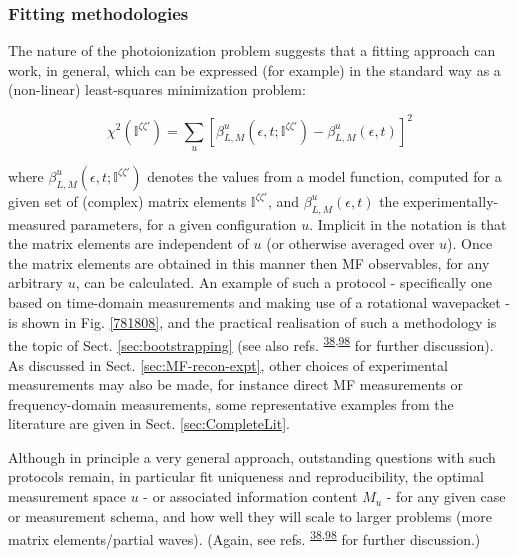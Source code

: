 \documentclass[10pt]{article}
\begin{document}
\subsubsection{Fitting methodologies\label{sec:fitting-intro}}

The nature of the photoionization problem suggests that a fitting approach can work, in general, which can be expressed (for example) in the standard way as a (non-linear) least-squares minimization problem:

\begin{equation}
\chi^{2}(\mathbb{I}^{\zeta\zeta'})=\sum_{u}\left[\beta^{u}_{L,M}(\epsilon,t;\mathbb{I}^{\zeta\zeta'})-\beta^{u}_{L,M}(\epsilon,t)\right]^{2}\label{eq:chi2-I}
\end{equation}

where $\beta^{u}_{L,M}(\epsilon,t;\mathbb{I}^{\zeta\zeta'})$ denotes  the values from a model function, computed for a given set of (complex) matrix elements $\mathbb{I}^{\zeta\zeta'}$, and $\beta^{u}_{L,M}(\epsilon,t)$ the experimentally-measured parameters, for a given configuration $u$. Implicit in the notation is that the matrix elements are independent of $u$ (or otherwise averaged over $u$). Once the matrix elements are obtained in this manner then MF observables, for any arbitrary $u$, can be calculated. An example of such a protocol - specifically one based on time-domain measurements and making use of a rotational wavepacket - is shown in Fig. \ref{781808}, %
and the practical realisation of such a methodology is the topic of Sect. \ref{sec:bootstrapping} (see also refs. \textsuperscript{\hyperref[csl:38]{38},\hyperref[csl:98]{98}} for further discussion). As discussed in Sect. \ref{sec:MF-recon-expt}, other choices of experimental measurements may also be made, for instance direct MF measurements or frequency-domain measurements, some representative examples from the literature are given in Sect. \ref{sec:CompleteLit}. 

Although in principle a very general approach, outstanding questions with such protocols remain, in particular fit uniqueness and reproducibility, the optimal measurement space $u$ - or associated information content $M_u$ - for any given case or measurement schema, and how well they will scale to larger problems (more matrix elements/partial waves). (Again, see refs. \textsuperscript{\hyperref[csl:38]{38},\hyperref[csl:98]{98}} for further discussion.)
\end{document}
